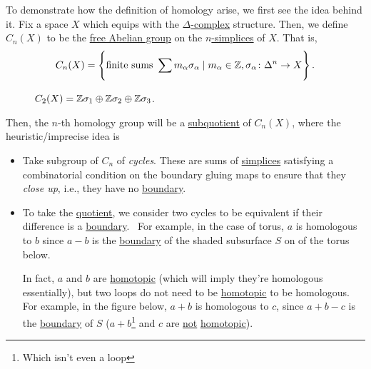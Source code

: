 To demonstrate how the definition of homology arise, we first see the idea behind it. Fix a space \(X\) which equips with the \hyperref[def:delta-complex]{\(\Delta\)-complex}
structure. Then, we define \(C_{n} (X)\) to be the \hyperref[def:free-Abelian-group]{free Abelian group} on the \hyperref[def:standard-simplex]{\(n\)-simplices} of \(X\). That is,
\[
	C_{n} (X) = \left\{\text{finite sums } \sum\limits_{}^{} m_\alpha \sigma _\alpha \mid m_\alpha \in \mathbb{\MakeUppercase{z}} , \sigma _\alpha \colon \Delta ^n\to X\right\}.
\]
\begin{figure}[H]
	\centering
	\caption{\(C_2(X) = \mathbb{\MakeUppercase{z}} \sigma _1 \oplus \mathbb{\MakeUppercase{z}} \sigma _2\oplus \mathbb{\MakeUppercase{z}} \sigma _3\).}
	\label{fig:C2-lec21}
\end{figure}
Then, the \(n\)-th homology group will be a \hyperref[CW-complex-quotient]{subquotient} of \(C_{n} (X)\), where the heuristic/imprecise idea is
\begin{itemize}
	\item Take subgroup of \(C_{n}\) of \emph{cycles}. These are sums of \hyperref[def:standard-simplex]{simplices} satisfying a combinatorial condition
	      on the boundary gluing maps to ensure that they \emph{close up}, i.e., they have no \hyperref[def:boundary]{boundary}.
	      \begin{figure}[H]
		      \centering
		      \label{fig:lec21-demo-of-homology-group}
	      \end{figure}
	\item To take the \hyperref[CW-complex-quotient]{quotient}, we consider two cycles to be equivalent if their difference is a \hyperref[def:boundary]{boundary}. \
	      For example, in the case of torus, \(a\) is homologous to \(b\) since \(a - b\) is the \hyperref[def:boundary]{boundary} of the shaded subsurface \(S\) on
	      of the torus below.
	      \begin{figure}[H]
		      \centering
		      \label{fig:lec21-torus}
	      \end{figure}
	      In fact, \(a\) and \(b\) are \hyperref[def:homotopic]{homotopic} (which will imply they're homologous essentially), but two loops do not
	      need to be \hyperref[def:homotopic]{homotopic} to be homologous. For example, in the figure below, \(a+b\) is homologous to \(c\), since
	      \(a+b-c\) is the \hyperref[def:boundary]{boundary} of \(S\) (\(a+b\)\footnote{Which isn't even a loop} and \(c\) are \underline{not} \hyperref[def:homotopic]{homotopic}).
	      \begin{figure}[H]
		      \centering
		      \label{fig:lec21-3-torus}
	      \end{figure}
\end{itemize}

